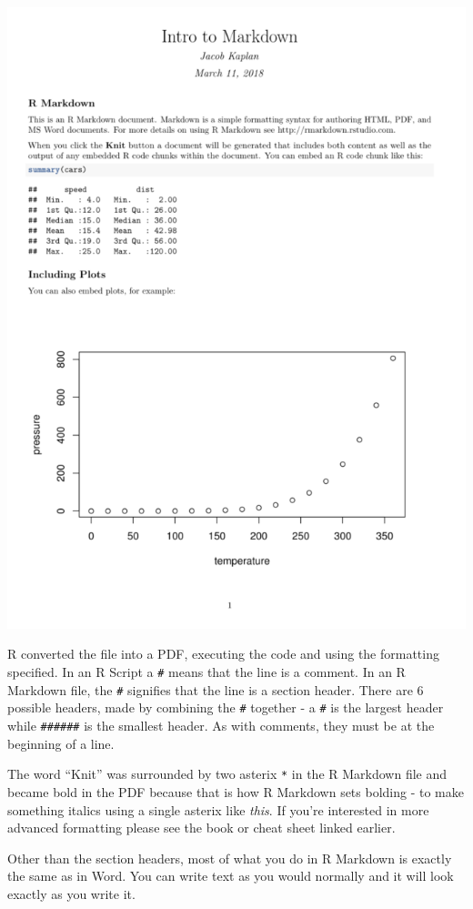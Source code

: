 \documentclass[
]{krantz}
\begin{document}
\includegraphics{images/markdown_output_example.PNG}

R converted the file into a PDF, executing the code and using the formatting specified. In an R Script a \texttt{\#} means that the line is a comment. In an R Markdown file, the \texttt{\#} signifies that the line is a section header. There are 6 possible headers, made by combining the \texttt{\#} together - a \texttt{\#} is the largest header while \texttt{\#\#\#\#\#\#} is the smallest header. As with comments, they must be at the beginning of a line.

The word ``Knit'' was surrounded by two asterix \texttt{*} in the R Markdown file and became bold in the PDF because that is how R Markdown sets bolding - to make something italics using a single asterix like \emph{this}. If you're interested in more advanced formatting please see the book or cheat sheet linked earlier.

Other than the section headers, most of what you do in R Markdown is exactly the same as in Word. You can write text as you would normally and it will look exactly as you write it.
\end{document}
